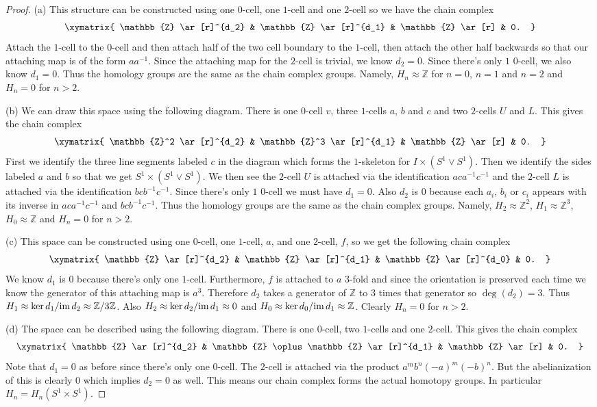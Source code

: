 \documentclass{article}
\newcommand{\im}{\textup{im}\,}
\begin{document}
\begin{proof}
(a) This structure can be constructed using one $0$-cell, one $1$-cell and one $2$-cell so we have the chain complex
\[
\xymatrix{
\mathbb{Z} \ar[r]^{d_2} & \mathbb{Z} \ar[r]^{d_1} & \mathbb{Z} \ar[r] & 0.
}
\]
Attach the $1$-cell to the $0$-cell and then attach half of the two cell boundary to the $1$-cell, then attach the other half backwards so that our attaching map is of the form $aa^{-1}$. Since the attaching map for the $2$-cell is trivial, we know $d_2 = 0$. Since there's only $1$ $0$-cell, we also know $d_1 = 0$. Thus the homology groups are the same as the chain complex groups. Namely, $H_n \approx \mathbb{Z}$ for $n = 0$, $n = 1$ and $n = 2$ and $H_n = 0$ for $n > 2$.

(b) We can draw this space using the following diagram. There is one $0$-cell $v$, three $1$-cells $a$, $b$ and $c$ and two $2$-cells $U$ and $L$. This gives the chain complex
\[
\xymatrix{
\mathbb{Z}^2 \ar[r]^{d_2} & \mathbb{Z}^3 \ar[r]^{d_1} & \mathbb{Z} \ar[r] & 0.
}
\]
\vspace{100pt}
First we identify the three line segments labeled $c$ in the diagram which forms the $1$-skeleton for $I \times (S^1 \vee S^1)$. Then we identify the sides labeled $a$ and $b$ so that we get $S^1 \times (S^1 \vee S^1)$. We then see the $2$-cell $U$ is attached via the identification $aca^{-1}c^{-1}$ and the $2$-cell $L$ is attached via the identification $bcb^{-1}c^{-1}$. Since there's only $1$ $0$-cell we must have $d_1 = 0$. Also $d_2$ is $0$ because each $a_i$, $b_i$ or $c_i$ appears with its inverse in $aca^{-1}c^{-1}$ and $bcb^{-1}c^{-1}$. Thus the homology groups are the same as the chain complex groups. Namely, $H_2 \approx \mathbb{Z}^2$, $H_1 \approx \mathbb{Z}^3$, $H_0 \approx \mathbb{Z}$ and $H_n = 0$ for $n > 2$.

(c) This space can be constructed using one $0$-cell, one $1$-cell, $a$, and one $2$-cell, $f$, so we get the following chain complex
\[
\xymatrix{
\mathbb{Z} \ar[r]^{d_2} & \mathbb{Z} \ar[r]^{d_1} & \mathbb{Z} \ar[r]^{d_0} & 0.
}
\]
We know $d_1$ is $0$ because there's only one $1$-cell. Furthermore, $f$ is attached to $a$ $3$-fold and since the orientation is preserved each time we know the generator of this attaching map is $a^3$. Therefore $d_2$ takes a generator of $\mathbb{Z}$ to $3$ times that generator so $\deg(d_2) = 3$. Thus $H_1 \approx \ker d_1/\im d_2 \approx \mathbb{Z}/3\mathbb{Z}$. Also $H_2 \approx \ker d_2/\im d_1 \approx 0$ and $H_0 \approx \ker d_0/\im d_1 \approx \mathbb{Z}$. Clearly $H_n = 0$ for $n > 2$.

(d) The space can be described using the following diagram.
\vspace{100pt}
There is one $0$-cell, two $1$-cells and one $2$-cell.
This gives the chain complex
\[
\xymatrix{
\mathbb{Z} \ar[r]^{d_2} & \mathbb{Z} \oplus \mathbb{Z} \ar[r]^{d_1} & \mathbb{Z} \ar[r] & 0.
}
\]
Note that $d_1 = 0$ as before since there's only one $0$-cell. The $2$-cell is attached via the product $a^mb^n(-a)^m(-b)^n$. But the abelianization of this is clearly $0$ which implies $d_2 = 0$ as well. This means our chain complex forms the actual homotopy groups. In particular $H_n = H_n(S^1 \times S^1)$.
\end{proof}
\end{document}
